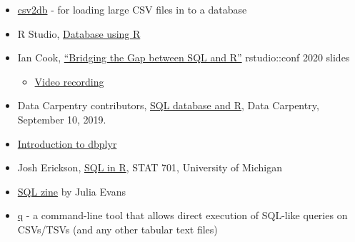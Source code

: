 \documentclass[
]{book}
\providecommand{\tightlist}{%
  \setlength{\itemsep}{0pt}\setlength{\parskip}{0pt}}
\begin{document}
\begin{itemize}
\tightlist
\item
  \href{https://github.com/csv2db/csv2db}{csv2db} - for loading large CSV files in to a database
\item
  R Studio, \href{https://db.rstudio.com/}{Database using R}
\item
  Ian Cook, \href{https://github.com/ianmcook/rstudioconf2020/blob/master/bridging_the_gap_between_sql_and_r.pdf}{``Bridging the Gap between SQL and R''} rstudio::conf 2020 slides

  \begin{itemize}
  \tightlist
  \item
    \href{https://www.youtube.com/watch?v=JwP5KdWSgqE&ab_channel=RStudio}{Video recording}
  \end{itemize}
\item
  Data Carpentry contributors, \href{https://datacarpentry.org/R-ecology-lesson/05-r-and-databases.html}{SQL database and R}, Data Carpentry, September 10, 2019.
\item
  \href{https://cran.r-project.org/web/packages/dbplyr/vignettes/dbplyr.html}{Introduction to dbplyr}
\item
  Josh Erickson, \href{http://dept.stat.lsa.umich.edu/~jerrick/courses/stat701/notes/sql.html}{SQL in R}, STAT 701, University of Michigan
\item
  \href{https://wizardzines.com/zines/sql/}{SQL zine} by Julia Evans
\item
  \href{http://harelba.github.io/q/}{q} - a command-line tool that allows direct execution of SQL-like queries on CSVs/TSVs (and any other tabular text files)
\end{itemize}
\end{document}
